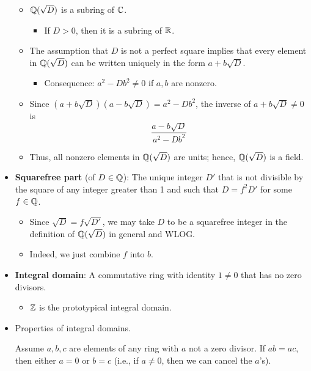 \documentclass[../notes.tex]{subfiles}
\begin{document}
\begin{itemize}
\begin{itemize}
\begin{itemize}
        \end{itemize}
        \item $\mathbb{Q}(\sqrt{D})$ is a subring of $\mathbb{C}$.
        \begin{itemize}
            \item If $D>0$, then it is a subring of $\mathbb{R}$.
        \end{itemize}
        \item The assumption that $D$ is not a perfect square implies that every element in $\mathbb{Q}(\sqrt{D})$ can be written uniquely in the form $a+b\sqrt{D}$.
        \begin{itemize}
            \item Consequence: $a^2-Db^2\neq 0$ if $a,b$ are nonzero.
        \end{itemize}
        \item Since $(a+b\sqrt{D})(a-b\sqrt{D})=a^2-Db^2$, the inverse of $a+b\sqrt{D}\neq 0$ is
        \begin{equation*}
            \frac{a-b\sqrt{D}}{a^2-Db^2}
        \end{equation*}
        \item Thus, all nonzero elements in $\mathbb{Q}(\sqrt{D})$ are units; hence, $\mathbb{Q}(\sqrt{D})$ is a field.
    \end{itemize}
    \item \textbf{Squarefree part} (of $D\in\mathbb{Q}$): The unique integer $D'$ that is not divisible by the square of any integer greater than 1 and such that $D=f^2D'$ for some $f\in\mathbb{Q}$.
    \begin{itemize}
        \item Since $\sqrt{D}=f\sqrt{D'}$, we may take $D$ to be a squarefree integer in the definition of $\mathbb{Q}(\sqrt{D})$ in general and WLOG.
        \item Indeed, we just combine $f$ into $b$.
    \end{itemize}
    \item \textbf{Integral domain}: A commutative ring with identity $1\neq 0$ that has no zero divisors.
    \begin{itemize}
        \item $\mathbb{Z}$ is the prototypical integral domain.
    \end{itemize}
    \item Properties of integral domains.
    \begin{proposition}\label{prp:7.2}
        Assume $a,b,c$ are elements of any ring with $a$ not a zero divisor. If $ab=ac$, then either $a=0$ or $b=c$ (i.e., if $a\neq 0$, then we can cancel the $a$'s).\par

\end{proposition}
\end{itemize}
\end{document}
